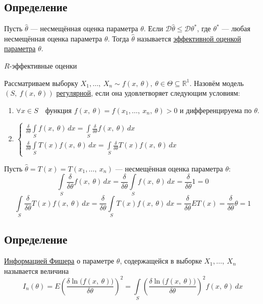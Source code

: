 \documentclass[12pt, a4paper]{article}
\newcommand{\dev}{\mathcal{D}}
\begin{document}
\subsection*{Определение}
Пусть $\hat{\theta}$ --- несмещённая оценка параметра $\theta$. Если $\dev\hat{\theta} \leq \dev \theta^*$, где $\theta^*$ --- любая несмещённая оценка параметра $\theta$. Тогда $\hat{\theta}$ называется \underline{эффективной оценкой параметра} $\theta$.
\begin{center}
    $R$-эффективные оценки
\end{center}
Рассматриваем выборку $X_1,\ldots,\ X_n \sim f(x,\ \theta),\ \theta\in \Theta \subseteq \mathbb{R}^1$. Назовём модель $(S,\ f(x,\ \theta))$ \underline{регулярной}, если она удовлетворяет следующим условиям:
\begin{enumerate}
    \item $\forall x\in S\quad \text{функция } f(x,\ \theta) = f(x_1,\dots,\ x_n,\ \theta) > 0$ и дифференцируема по $\theta$.
    \item $\begin{cases} \displaystyle\frac{\delta}{\delta \theta} \int\limits_S f(x,\ \theta)\, dx = \int\limits_S \frac{\delta}{\delta \theta} f(x,\ \theta)\, dx\\
        \displaystyle \frac{\delta}{\delta \theta} \int\limits_S T(x)f(x,\ \theta)\, dx = \int\limits_S \frac{\delta}{\delta \theta} T(x) f(x,\ \theta)\, dx \end{cases}$
\end{enumerate}
Пусть $\hat{\theta} = T(x) = T(x_1,\dots,\ x_n)$ --- несмещённая оценка параметра $\theta$:
\[\int\limits_S \frac{\delta}{\delta \theta} f(x,\ \theta)\, dx = \frac{\delta}{\delta \theta} \int\limits_S f(x,\ \theta)\, dx = \frac{\delta}{\delta \theta} 1 = 0\]
\[\int\limits_S \frac{\delta}{\delta \theta} T(x) f(x,\ \theta)\, dx =  \frac{\delta}{\delta \theta} \int\limits_S T(x) f(x,\ \theta) \, dx = \frac{\delta}{\delta\theta} ET(x) = \frac{\delta}{\delta \theta}\theta = 1\]
\subsection*{Определение}
\underline{Информацией Фишера} о параметре $\theta$, содержащейся в выборке $X_1,\dots,\ X_n$ называется величина
\[I_n(\theta) = E{\left( \frac{\delta \ln \big(f(x,\ \theta)\big)}{\delta \theta} \right)}^2 = \int\limits_S{\left( \frac{\delta \ln \big(f(x,\ \theta)\big)}{\delta \theta} \right)}^2 f(x,\ \theta)\, dx\]
\end{document}
